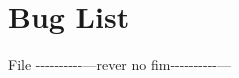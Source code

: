 \chapter{Bug List}
\hypertarget{bug}{}\label{bug}

\begin{DoxyRefList}
\item[File \doxylink{MyDLL_8h}{My\+DLL.h} ]\label{bug__bug000001}%
%
-\/-\/-\/-\/-\/-\/-\/-\/-\/-\/---rever no fim-\/-\/-\/-\/-\/-\/-\/-\/-\/-\/--- 
\end{DoxyRefList}